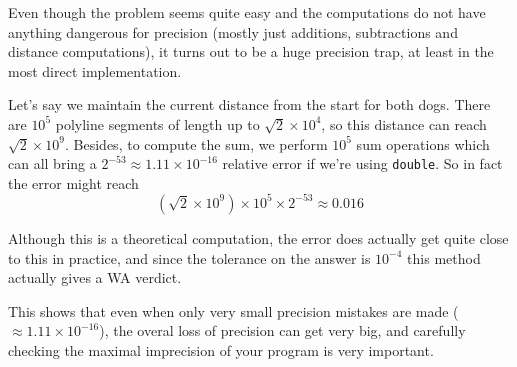 Even though the problem seems quite easy and the computations do not have anything dangerous for precision (mostly just additions, subtractions and distance computations), it turns out to be a huge precision trap, at least in the most direct implementation.

Let's say we maintain the current distance from the start for both dogs. There are $10^5$ polyline segments of length up to $\sqrt{2}\times 10^4$, so this distance can reach $\sqrt{2}\times 10^9$. Besides, to compute the sum, we perform $10^5$ sum operations which can all bring a $2^{-53} \approx 1.11 \times 10^{-16}$ relative error if we're using \lstinline|double|. So in fact the error might reach
\[\left(\sqrt{2}\times 10^9\right) \times 10^5 \times 2^{-53} \approx 0.016\]

Although this is a theoretical computation, the error does actually get quite close to this in practice, and since the tolerance on the answer is $10^{-4}$ this method actually gives a WA verdict.

This shows that even when only very small precision mistakes are made ($\approx 1.11 \times 10^{-16}$), the overal loss of precision can get very big, and carefully checking the maximal imprecision of your program is very important.
